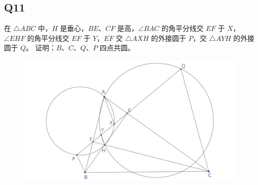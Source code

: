 \documentclass{article}
\begin{document}
\subsection{Q11}
在 $\triangle ABC$ 中，$H$ 是垂心，$BE$、$CF$ 是高，$\angle BAC$ 的角平分线交 $EF$ 于 $X$，$\angle EHF$ 的角平分线交 $EF$ 于 $Y$，$EF$ 交 $\triangle AXH$ 的外接圆于 $P$，交 $\triangle AYH$ 的外接圆于 $Q$。
证明：$B$、$C$、$Q$、$P$ 四点共圆。
\begin{figure}[htbp]
    \centering
    \includegraphics[width=0.9\linewidth]{figures/Q11.png}
\end{figure}
\end{document}
